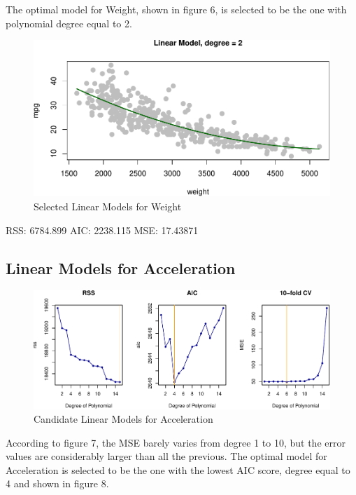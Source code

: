 \documentclass[]{article}
\begin{document}
The optimal model for Weight, shown in figure 6, is selected to be the
one with polynomial degree equal to 2.

\begin{figure}

{\centering \includegraphics{Report_files/figure-latex/lm-w-best-1} 

}

\caption{Selected Linear Models for Weight}\label{fig:lm-w-best}
\end{figure}

RSS: 6784.899 AIC: 2238.115 MSE: 17.43871

\hypertarget{linear-models-for-acceleration}{%
\subsection{Linear Models for
Acceleration}\label{linear-models-for-acceleration}}

\begin{figure}

{\centering \includegraphics{Report_files/figure-latex/lm-a-1} 

}

\caption{Candidate Linear Models for Acceleration}\label{fig:lm-a}
\end{figure}

According to figure 7, the MSE barely varies from degree 1 to 10, but
the error values are considerably larger than all the previous. The
optimal model for Acceleration is selected to be the one with the lowest
AIC score, degree equal to 4 and shown in figure 8.
\end{document}
